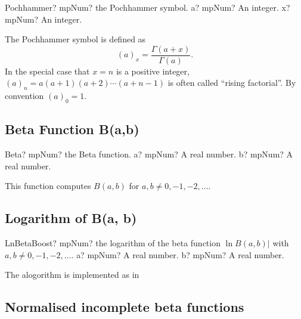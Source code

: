 \begin{mpFunctionsExtract}
	\mpFunctionTwo
	{Pochhammer? mpNum? the Pochhammer symbol.}
	{a? mpNum? An integer.}
	{x? mpNum? An integer.}
\end{mpFunctionsExtract}

\vspace{0.3cm}
The Pochhammer symbol is defined as
\begin{equation}
	(a)_x = \frac{\Gamma(a+x)}{\Gamma(a)}.
\end{equation}
In the special case that $x=n$ is a positive integer, $(a)_n = a(a+1)(a+2) \cdots (a+n-1)$ is often called "`rising factorial"'. By convention $(a)_0 = 1$.





\subsection{Beta Function B(a,b)}
\label{BetaFunction}
\begin{mpFunctionsExtract}
	\mpFunctionTwo
	{Beta? mpNum? the Beta function.}
	{a? mpNum? A real number.}
	{b? mpNum? A real number.}
\end{mpFunctionsExtract}

\vspace{0.3cm}
This function computes $B(a,b)$ for $a, b \neq 0, -1, -2, \ldots$. 




\subsection{Logarithm of  B(a, b)}

\begin{mpFunctionsExtract}
	\mpFunctionTwo
	{LnBetaBoost? mpNum? the logarithm of the beta function $\ln B(a,b)|$ with $a,b \neq 0,-1,-2,\ldots$.}
	{a? mpNum? A real number.}
	{b? mpNum? A real number.}
\end{mpFunctionsExtract}



The alogorithm is implemented as in \cite{DiDonato_1987}

\subsection{Normalised incomplete beta functions}
\label{sec:IncompleteBetaFunctionBoost}
\label{sec:NormalisedIncompleteBetaFunction}


